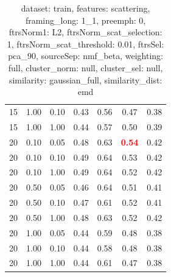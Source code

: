 \begin{table}
\begin{center}
\begin{tabular}{lllcccc}
15 & 1.00 & 0.10 & 0.43 & 0.56 & 0.47 & 0.38 \\ 
15 & 1.00 & 1.00 & 0.44 & 0.57 & 0.50 & 0.39 \\ 
20 & 0.10 & 0.05 & 0.48 & 0.63 & \textbf{\textcolor{red}{0.54}} & 0.42 \\ 
20 & 0.10 & 0.10 & 0.49 & 0.64 & 0.53 & 0.42 \\ 
20 & 0.10 & 1.00 & 0.49 & 0.64 & 0.52 & 0.42 \\ 
20 & 0.50 & 0.05 & 0.46 & 0.64 & 0.51 & 0.41 \\ 
20 & 0.50 & 0.10 & 0.47 & 0.61 & 0.52 & 0.41 \\ 
20 & 0.50 & 1.00 & 0.48 & 0.63 & 0.52 & 0.42 \\ 
20 & 1.00 & 0.05 & 0.44 & 0.59 & 0.48 & 0.38 \\ 
20 & 1.00 & 0.10 & 0.44 & 0.58 & 0.48 & 0.38 \\ 
20 & 1.00 & 1.00 & 0.44 & 0.61 & 0.47 & 0.38 \\ 
\end{tabular} 
\end{center} 
\caption{dataset: train, features: scattering, framing\_long: 1\_1, preemph: 0, ftrsNorm1: L2, ftrsNorm\_scat\_selection: 1, ftrsNorm\_scat\_threshold: 0.01, ftrsSel: pca\_90, sourceSep: nmf\_beta, weighting: full, cluster\_norm: null, cluster\_sel: null, similarity: gaussian\_full, similarity\_dist: emd} 
\label{datasetrFeaturscFraminlong1_1Preemp0Ftrsnorm1L2Ftrsnoscatselect1Ftrsnoscatthresh0.01Ftrsselpc90SourcesepnmbeWeightfuClustenormnuClusteselnuSimilagafuSimiladistem} 
\end{table} 
 
